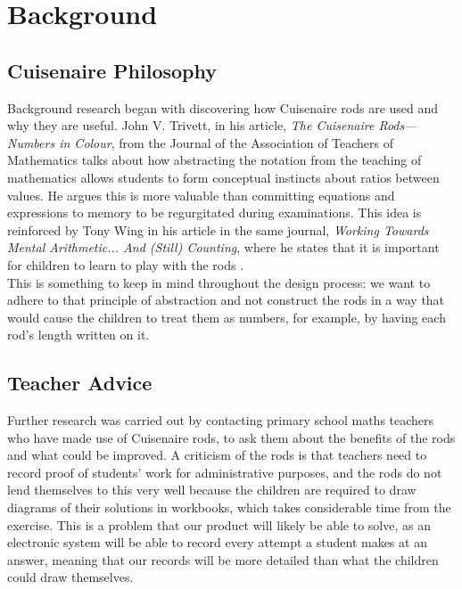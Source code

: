 \chapter{Background}

\section{Cuisenaire\textsuperscript{\textregistered} Philosophy}
Background research began with discovering how Cuisenaire\textsuperscript{\textregistered} rods are used and why they are useful. John V. Trivett, in his article, \emph{The Cuisenaire Rods—Numbers in Colour}, from the Journal of the Association of Teachers of Mathematics \cite{johnv.trivett1962} talks about how abstracting the notation from the teaching of mathematics allows students to form conceptual instincts about ratios between values. He argues this is more valuable than committing equations and expressions to memory to be regurgitated during examinations. This idea is reinforced by Tony Wing in his article in the same journal, \emph{Working Towards Mental Arithmetic... And (Still) Counting}\cite{tonywing1996}, where he states that it is important for children to learn to play with the rods .\\

This is something to keep in mind throughout the design process: we want to adhere to that principle of abstraction and not construct the rods in a way that would cause the children to treat them as numbers, for example, by having each rod's length written on it. \\

\section{Teacher Advice}

Further research was carried out by contacting primary school maths teachers who have made use of Cuisenaire\textsuperscript{\textregistered} rods, to ask them about the benefits of the rods and what could be improved. A criticism of the rods is that teachers need to record proof of students' work for administrative purposes, and the rods do not lend themselves to this very well because the children are required to draw diagrams of their solutions in workbooks, which takes considerable time from the exercise. This is a problem that our product will likely be able to solve, as an electronic system will be able to record every attempt a student makes at an answer, meaning that our records will be more detailed than what the children could draw themselves.\\

